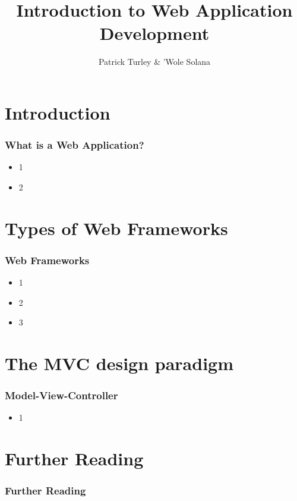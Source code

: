 \documentclass[10pt,t,xcolor=dvipsnames]{beamer}
\title{ Introduction to Web Application Development }
\author{ Patrick Turley \& 'Wole Solana }
\begin{document}
\nocite*{}
\frame [c, plain]{\titlepage}
\section{Introduction}
\begin{frame}
\frametitle{What is a Web Application?}
\pause
\begin{itemize}[<+->]
\item 1
\item 2
\end{itemize}
\end{frame}
\section{Types of Web Frameworks}
\begin{frame}[fragile]
\frametitle{Web Frameworks}
\pause
\begin{itemize}[<+->]
\item 1
\item 2
\item 3
\end{itemize}
\end{frame}
\section{The MVC design paradigm}
\begin{frame}[fragile]
\frametitle{Model-View-Controller}
\pause
\begin{itemize}[<+->]
\item 1
\end{itemize}
\end{frame}
\section{Further Reading}
\begin{frame}
\frametitle{Further Reading}
% 
% 
\end{frame}
\end{document}
